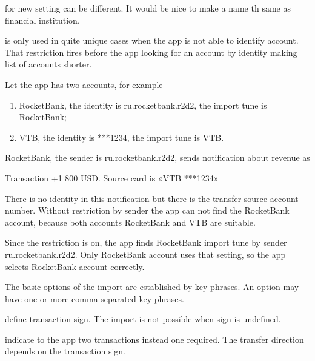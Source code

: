 \documentclass[a4paper,10pt,english]{sphinxmanual}
\begin{document}
\sphinxAtStartPar
{} for new setting can be different. It would be nice to make a name th same as
financial institution.

\sphinxAtStartPar
{} is only used in quite unique cases when the app is not able
to identify account. That restriction fires before the app looking for an account by identity making list
of accounts shorter.

\sphinxAtStartPar
Let the app has two accounts, for example
\begin{enumerate}
%
\item {} 
\sphinxAtStartPar
RocketBank, the identity is ru.rocketbank.r2d2, the import tune is RocketBank;

\item {} 
\sphinxAtStartPar
VTB, the identity is ***1234, the import tune is VTB.

\end{enumerate}

\sphinxAtStartPar
RocketBank, the sender is ru.rocketbank.r2d2, sends notification about revenue as

\begin{sphinxVerbatim}[commandchars=\\\{\}]
Transaction \PYGZgt{}\PYGZgt{} +1 800 USD.
Source card is «VTB ***1234»
\end{sphinxVerbatim}

\sphinxAtStartPar
There is no identity in this notification but there is the transfer source account number. Without
restriction by sender the app can not find the RocketBank account, because both accounts
RocketBank and VTB are suitable.

\sphinxAtStartPar
Since the restriction is on, the app finds RocketBank import tune by sender ru.rocketbank.r2d2.
Only RocketBank account uses that setting, so the app selects RocketBank account correctly.

\sphinxAtStartPar
The basic options of the import are established by key phrases. An option may have one or more
comma separated key phrases.

\sphinxAtStartPar
{} define transaction sign. The import is not possible when
sign is undefined.

\sphinxAtStartPar
{} indicate to the app two transactions instead one required.
The transfer direction depends on the transaction sign.
\end{document}
